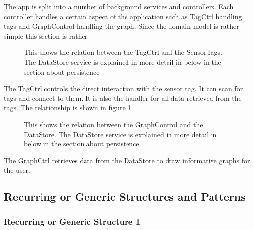 \documentclass[]{article}
\begin{document}
The app is split into a number of background services and controllers. Each controller handles a certain aspect of the application such as TagCtrl handling tags and GraphControl handling the graph. Since the domain model is rather simple this section is rather 

\begin{figure}
\center
{}
\caption{This shows the relation between the TagCtrl and the SensorTags. The DataStore service is explained in more detail in below in the section about persistence}
\label{figTagCtrl}
\end{figure}

The TagCtrl controls the direct interaction with the sensor tag. It can scan for tags and connect to them. It is also the handler for all data retrieved from the tags. The relationship is shown in figure \ref{figTagCtrl}.

\begin{figure}
\center
{}
\caption{This shows the relation between the GraphControl and the DataStore. The DataStore service is explained in more detail in below in the section about persistence}
\label{figGraphCtrl}
\end{figure}

The GraphCtrl retrieves data from the DataStore to draw informative graphs for the user.


\subsection{Recurring or Generic Structures and Patterns}

\subsubsection{Recurring or Generic Structure 1}
\end{document}
